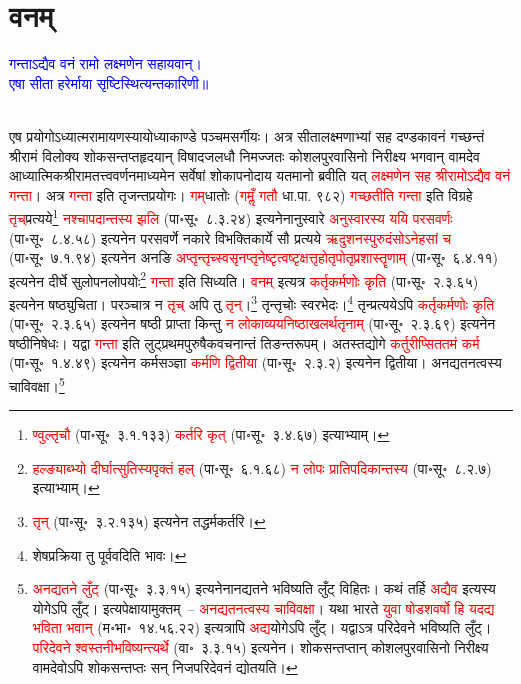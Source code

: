 \section[वनम्]{वनम्‌}
\centering\textcolor{blue}{गन्ताऽद्यैव वनं रामो लक्ष्मणेन सहायवान्।\nopagebreak\\
एषा सीता हरेर्माया सृष्टिस्थित्यन्तकारिणी॥}\nopagebreak\\
\\
\begin{sloppypar}\justifying\noindent\hspace{10mm} एष प्रयोगोऽध्यात्म\-रामायणस्यायोध्या\-काण्डे पञ्चमसर्गीयः। अत्र सीता\-लक्ष्मणाभ्यां सह दण्डकावनं गच्छन्तं श्रीरामं विलोक्य शोक\-सन्तप्त\-हृदयान् विषाद\-जलधौ निमज्जतः कोशल\-पुर\-वासिनो निरीक्ष्य भगवान् वामदेव आध्यात्मिक\-श्रीराम\-तत्त्व\-वर्णन\-माध्यमेन सर्वेषां शोकापनोदाय यतमानो ब्रवीति यत् \textcolor{red}{लक्ष्मणेन सह श्रीरामोऽद्यैव वनं गन्ता}। अत्र \textcolor{red}{गन्ता} इति तृजन्त\-प्रयोगः। \textcolor{red}{गम्‌}धातोः (\textcolor{red}{गमॢँ गतौ} धा.पा. ९८२) \textcolor{red}{गच्छतीति गन्ता} इति विग्रहे \textcolor{red}{तृच्‌}प्रत्यये\footnote{\textcolor{red}{ण्वुल्तृचौ} (पा॰सू॰~३.१.१३३) \textcolor{red}{कर्तरि कृत्‌} (पा॰सू॰~३.४.६७) इत्याभ्याम्।} \textcolor{red}{नश्चापदान्तस्य झलि} (पा॰सू॰~८.३.२४) इत्यनेनानुस्वारे \textcolor{red}{अनुस्वारस्य ययि परसवर्णः} (पा॰सू॰~८.४.५८) इत्यनेन परसवर्णे नकारे विभक्ति\-कार्ये सौ प्रत्यये \textcolor{red}{ऋदुशनस्पुरुदंसोऽनेहसां च} (पा॰सू॰~७.१.९४) इत्यनेन अनङि \textcolor{red}{अप्तृन्तृच्स्वसृ\-नप्तृ\-नेष्टृ\-त्वष्टृ\-क्षत्तृ\-होतृ\-पोतृ\-प्रशास्तॄणाम्‌} (पा॰सू॰~६.४.११) इत्यनेन दीर्घे सुलोप\-नलोपयोः\footnote{\textcolor{red}{हल्ङ्याब्भ्यो दीर्घात्सुतिस्यपृक्तं हल्‌} (पा॰सू॰~६.१.६८) \textcolor{red}{न लोपः प्रातिपदिकान्तस्य} (पा॰सू॰~८.२.७) इत्याभ्याम्।} \textcolor{red}{गन्ता} इति सिध्यति। \textcolor{red}{वनम्‌} इत्यत्र \textcolor{red}{कर्तृ\-कर्मणोः कृति} (पा॰सू॰~२.३.६५) इत्यनेन षष्ठ्युचिता। परञ्चात्र न \textcolor{red}{तृच्‌} अपि तु \textcolor{red}{तृन्‌}।\footnote{\textcolor{red}{तृन्‌} (पा॰सू॰~३.२.१३५) इत्यनेन तद्धर्मकर्तरि।} तृन्तृचोः स्वरभेदः।\footnote{शेषप्रक्रिया तु पूर्ववदिति भावः।} तृन्प्रत्ययेऽपि \textcolor{red}{कर्तृ\-कर्मणोः कृति} (पा॰सू॰~२.३.६५) इत्यनेन षष्ठी प्राप्ता किन्तु \textcolor{red}{न लोकाव्यय\-निष्ठा\-खलर्थ\-तृनाम्‌} (पा॰सू॰~२.३.६९) इत्यनेन षष्ठीनिषेधः। यद्वा \textcolor{red}{गन्ता} इति लुट्प्रथम\-पुरुषैक\-वचनान्तं तिङन्त\-रूपम्। अतस्तद्योगे \textcolor{red}{कर्तुरीप्सिततमं कर्म} (पा॰सू॰~१.४.४९) इत्यनेन कर्मसञ्ज्ञा \textcolor{red}{कर्मणि द्वितीया} (पा॰सू॰~२.३.२) इत्यनेन द्वितीया। अनद्यतनत्वस्य चाविवक्षा।\footnote{\textcolor{red}{अनद्यतने लुँट्‌} (पा॰सू॰~३.३.१५) इत्यनेनानद्यतने भविष्यति लुँट् विहितः। कथं तर्हि \textcolor{red}{अद्यैव} इत्यस्य योगेऽपि लुँट्। इत्यपेक्षायामुक्तम्~– \textcolor{red}{अनद्यतनत्वस्य चाविवक्षा}। यथा भारते \textcolor{red}{युवा षोडशवर्षो हि यदद्य भविता भवान्‌} (म॰भा॰~१४.५६.२२) इत्यत्रापि \textcolor{red}{अद्य}योगेऽपि लुँट्। यद्वाऽत्र परिदेवने भविष्यति लुँट्। \textcolor{red}{परिदेवने श्वस्तनीभविष्यन्त्यर्थे} (वा॰~३.३.१५) इत्यनेन। शोक\-सन्तप्तान् कोशल\-पुर\-वासिनो निरीक्ष्य वामदेवोऽपि शोकसन्तप्तः सन् निजपरिदेवनं द्योतयति।}\end{sloppypar}
